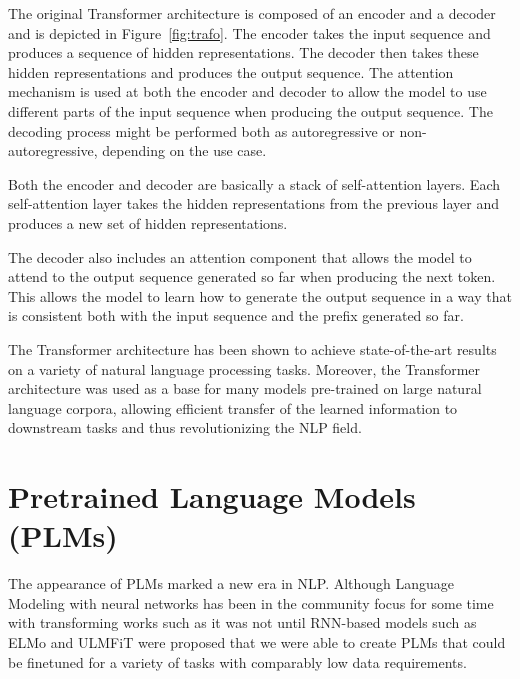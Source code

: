 The original Transformer architecture is composed of an encoder and a decoder and is depicted in Figure~\ref{fig:trafo}.
The encoder takes the input sequence and produces a sequence of hidden representations.
The decoder then takes these hidden representations and produces the output sequence.
The attention mechanism is used at both the encoder and decoder to allow the model to use different parts of the input sequence when producing the output sequence.
The decoding process might be performed both as autoregressive or non-autoregressive, depending on the use case.

Both the encoder and decoder are basically a stack of self-attention layers.
Each self-attention layer takes the hidden representations from the previous layer and produces a new set of hidden representations.

The decoder also includes an attention component that allows the model to attend to the output sequence generated so far when producing the next token.
This allows the model to learn how to generate the output sequence in a way that is consistent both with the input sequence and the prefix generated so far.

The Transformer architecture has been shown to achieve state-of-the-art results on a variety of natural language processing tasks. 
Moreover, the Transformer architecture was used as a base for many models pre-trained on large natural language corpora, allowing efficient transfer of the learned information to downstream tasks and thus revolutionizing the NLP field.

\section{Pretrained Language Models (PLMs)}
\label{background:plms}
The appearance of PLMs marked a new era in NLP.
Although Language Modeling with neural networks has been in the community focus for some time with transforming works such as  \citet{mikolov2010recurrent,mikolov2013distributed} it was not until RNN-based models such as ELMo \cite{peters-etal-2018-deep} and ULMFiT \cite{howard-ruder-2018-universal} were proposed that we were able to create PLMs that could be finetuned for a variety of tasks with comparably low data requirements.

